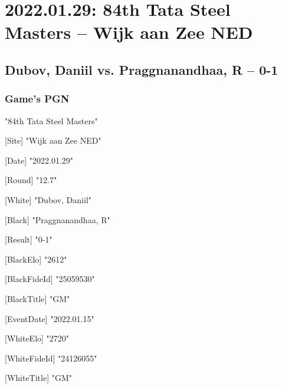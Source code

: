 \documentclass[9pt]{extarticle}
\begin{document}
\setlength{\columnsep}{32pt}
\section*{2022.01.29: 84th Tata Steel Masters -- Wijk aan Zee NED}

\subsection*{Dubov, Daniil vs. Praggnanandhaa, R -- 0-1}
\subsubsection*{Game's PGN}
\begin{flushleft}
[Event] "84th Tata Steel Masters"

[Site] "Wijk aan Zee NED"

[Date] "2022.01.29"

[Round] "12.7"

[White] "Dubov, Daniil"

[Black] "Praggnanandhaa, R"

[Result] "0-1"

[BlackElo] "2612"

[BlackFideId] "25059530"

[BlackTitle] "GM"

[EventDate] "2022.01.15"

[WhiteElo] "2720"

[WhiteFideId] "24126055"

[WhiteTitle] "GM"

\end{flushleft}
\parindent 0mm
\end{document}
